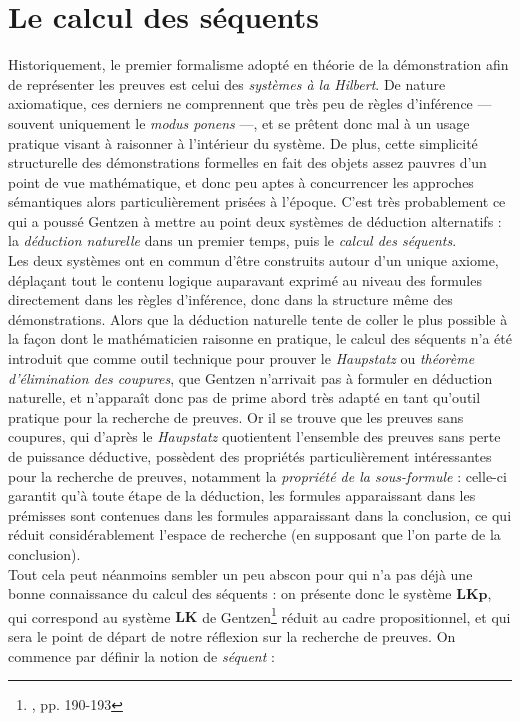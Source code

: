 \documentclass[12pt]{report}
\begin{document}
\chapter*{Le calcul des séquents}

Historiquement, le premier formalisme adopté en théorie de la démonstration afin de représenter les preuves est celui des \emph{systèmes à la Hilbert}. De nature axiomatique, ces derniers ne comprennent que très peu de règles d'inférence --- souvent uniquement le \textit{modus ponens} ---, et se prêtent donc mal à un usage pratique visant à raisonner à l'intérieur du système. De plus, cette simplicité structurelle des démonstrations formelles en fait des objets assez pauvres d'un point de vue mathématique, et donc peu aptes à concurrencer les approches sémantiques alors particulièrement prisées à l'époque. C'est très probablement ce qui a poussé Gentzen à mettre au point deux systèmes de déduction alternatifs : la \emph{déduction naturelle} dans un premier temps, puis le \emph{calcul des séquents}.\\

Les deux systèmes ont en commun d'être construits autour d'un unique axiome, déplaçant tout le contenu logique auparavant exprimé au niveau des formules directement dans les règles d'inférence, donc dans la structure même des démonstrations. Alors que la déduction naturelle tente de coller le plus possible à la façon dont le mathématicien raisonne en pratique, le calcul des séquents n'a été introduit que comme outil technique pour prouver le \textit{Haupstatz} ou \emph{théorème d'élimination des coupures}, que Gentzen n'arrivait pas à formuler en déduction naturelle, et n'apparaît donc pas de prime abord très adapté en tant qu'outil pratique pour la recherche de preuves. Or il se trouve que les preuves sans coupures, qui d'après le \textit{Haupstatz} quotientent l'ensemble des preuves sans perte de puissance déductive, possèdent des propriétés particulièrement intéressantes pour la recherche de preuves, notamment la \emph{propriété de la sous-formule} : celle-ci garantit qu'à toute étape de la déduction, les formules apparaissant dans les prémisses sont contenues dans les formules apparaissant dans la conclusion, ce qui réduit considérablement l'espace de recherche (en supposant que l'on parte de la conclusion).\\

Tout cela peut néanmoins sembler un peu abscon pour qui n'a pas déjà une bonne connaissance du calcul des séquents : on présente donc le système $\mathbf{LKp}$, qui correspond au système $\mathbf{LK}$ de Gentzen\footnote{\cite{Gen35}, pp. 190-193} réduit au cadre propositionnel, et qui sera le point de départ de notre réflexion sur la recherche de preuves. On commence par définir la notion de \emph{séquent} :
\end{document}
